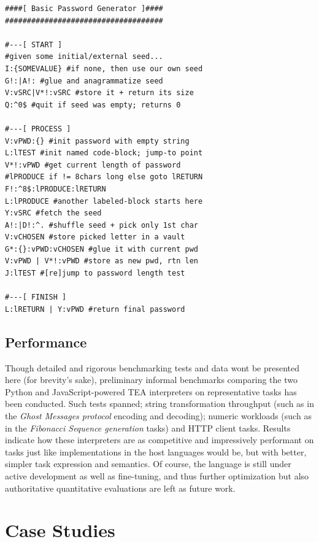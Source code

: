 \documentclass[acmtoplas]{acmart}
\begin{document}
\begin{lstlisting}[style=tea,caption=Basic 8-character Password Generator, label=LST3]
####[ Basic Password Generator ]####
####################################

#---[ START ]
#given some initial/external seed...
I:{SOMEVALUE} #if none, then use our own seed
G!:|A!: #glue and anagrammatize seed
V:vSRC|V*!:vSRC #store it + return its size
Q:^0$ #quit if seed was empty; returns 0

#---[ PROCESS ]
V:vPWD:{} #init password with empty string
L:lTEST #init named code-block; jump-to point
V*!:vPWD #get current length of password
#lPRODUCE if != 8chars long else goto lRETURN
F!:^8$:lPRODUCE:lRETURN 
L:lPRODUCE #another labeled-block starts here
Y:vSRC #fetch the seed
A!:|D!:^. #shuffle seed + pick only 1st char
V:vCHOSEN #store picked letter in a vault
G*:{}:vPWD:vCHOSEN #glue it with current pwd
V:vPWD | V*!:vPWD #store as new pwd, rtn len
J:lTEST #[re]jump to password length test

#---[ FINISH ]
L:lRETURN | Y:vPWD #return final password
\end{lstlisting}



\subsection{Performance}

Though detailed and rigorous benchmarking tests and data wont be presented here (for brevity's sake), preliminary informal benchmarks comparing the two Python and JavaScript-powered TEA interpreters on representative tasks has been conducted. Such tests spanned; string transformation throughput (such as in the \textit{Ghost Messages protocol} encoding and decoding); numeric workloads (such as in the \textit{Fibonacci Sequence generation} tasks) and HTTP client tasks. Results indicate how these interpreters are as competitive and impressively performant on tasks just like implementations in the host languages would be, but with better, simpler task expression and semantics. Of course, the language is still under active development as well as fine-tuning, and thus further optimization but also authoritative quantitative evaluations are  left as future work.

\section{Case Studies}
\label{SEC7}
\end{document}
